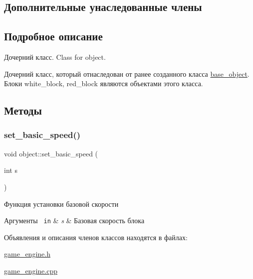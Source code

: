 \subsection*{Дополнительные унаследованные члены}


\subsection{Подробное описание}
Дочерний класс. Class for object. 

Дочерний класс, который отнаследован от ранее созданного класса \mbox{\hyperlink{classbase__object}{base\+\_\+object}}. Блоки white\+\_\+block, red\+\_\+block являются объектами этого класса. 

\subsection{Методы}
\mbox{\label{classobject_a8a93112d56c32430e1eb5560d2db6912}} 
\subsubsection{\texorpdfstring{set\_basic\_speed()}{set\_basic\_speed()}}
{\footnotesize\ttfamily void object\+::set\+\_\+basic\+\_\+speed (\begin{DoxyParamCaption}\item[{int}]{s }\end{DoxyParamCaption})}



Функция установки базовой скорости 


\begin{DoxyParams}[1]{Аргументы}
\mbox{\texttt{ in}}  & {\em s} & Базовая скорость блока \\
\hline
\end{DoxyParams}


Объявления и описания членов классов находятся в файлах\+:\begin{DoxyCompactItemize}
\item 
\mbox{\hyperlink{game__engine_8h}{game\+\_\+engine.\+h}}\item 
\mbox{\hyperlink{game__engine_8cpp}{game\+\_\+engine.\+cpp}}\end{DoxyCompactItemize}
